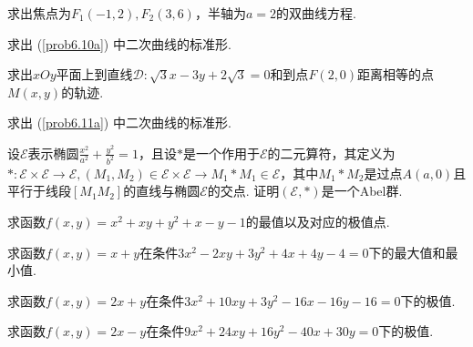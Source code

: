 \begin{problem}
  \begin{inparaenum}[(a)]
    \item\label{prob6.10a} 求出焦点为$F_1(-1,2),F_2(3,6)$，半轴为$a=2$的双曲线方程.

    \item 求出 (\ref{prob6.10a}) 中二次曲线的标准形.
  \end{inparaenum}
\end{problem}

\begin{problem}
  \begin{inparaenum}[(a)]
    \item\label{prob6.11a} 求出$xOy$平面上到直线$\mathscr D:\sqrt3x-3y+2\sqrt3=0$和到点$F(2,0)$距离相等的点$M(x,y)$的轨迹.

    \item 求出 (\ref{prob6.11a}) 中二次曲线的标准形.
  \end{inparaenum}
\end{problem}

\begin{problem}

设$\mathscr E$表示椭圆$\frac{x^2}{a^2}+\frac{y^2}{b^2}=1$，且设$\ast$是一个作用于$\mathscr E$的二元算符，其定义为$\ast:\mathscr E\times\mathscr E\to\mathscr E,(M_1,M_2)\in\mathscr E\times\mathscr E\to
M_1\ast M_1\in\mathscr E$，其中$M_1\ast M_2$是过点$A(a,0)$且平行于线段$[M_1M_2]$的直线与椭圆$\mathscr E$的交点. 证明$(\mathscr E,\ast)$是一个Abel群.
\end{problem}

\begin{problem}
  求函数$f(x,y)=x^2+xy+y^2+x-y-1$的最值以及对应的极值点.
\end{problem}

\begin{problem}

  \begin{inparaenum}[(a)]
    \item 求函数$f(x,y)=x+y$在条件$3x^2-2xy+3y^2+4x+4y-4=0$下的最大值和最小值.

    \item 求函数$f(x,y)=2x+y$在条件$3x^2+10xy+3y^2-16x-16y-16=0$下的极值.

    \item 求函数$f(x,y)=2x-y$在条件$9x^2+24xy+16y^2-40x+30y=0$下的极值.
  \end{inparaenum}
\end{problem}

